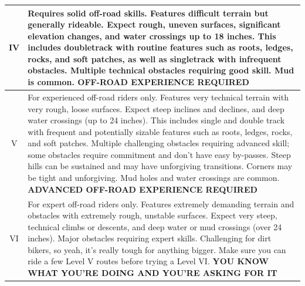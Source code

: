 \documentclass{article}
\begin{document}
\begin{minipage}[t]{1\linewidth}
\begin{center}
\begin{tabular}{|c|p{14cm}|}
            \hline
            IV             & Requires solid off-road skills. Features difficult terrain but generally rideable. Expect rough, uneven surfaces, significant elevation changes, and water crossings up to 18 inches. This includes doubletrack with routine features such as roots, ledges, rocks, and soft patches, as well as singletrack with infrequent obstacles. Multiple technical obstacles requiring good skill. Mud is common. \textbf{OFF-ROAD EXPERIENCE REQUIRED}                                                                                                                                                                           \\
            \hline
            V              & For experienced off-road riders only. Features very technical terrain with very rough, loose surfaces. Expect steep inclines and declines, and deep water crossings (up to 24 inches). This includes single and double track with frequent and potentially sizable features such as roots, ledges, rocks, and soft patches. Multiple challenging obstacles requiring advanced skill; some obstacles require commitment and don't have easy by-passes. Steep hills can be sustained and may have unforgiving transitions. Corners may be tight and unforgiving. Mud holes and water crossings are common. \textbf{ADVANCED OFF-ROAD EXPERIENCE REQUIRED} \\
            \hline
            \rowcolor{lightgrey}
            VI             & For expert off-road riders only. Features extremely demanding terrain and obstacles with extremely rough, unstable surfaces. Expect very steep, technical climbs or descents, and deep water or mud crossings (over 24 inches). Major obstacles requiring expert skills. Challenging for dirt bikers, so yeah, it's really tough for anything bigger. Make sure you can ride a few Level V routes before trying a Level VI.   \textbf{YOU KNOW WHAT YOU'RE DOING AND YOU'RE ASKING FOR IT}                                                                                                                                                              \\
            \hline
        \end{tabular}
    \end{center}
\end{minipage}
\end{document}

